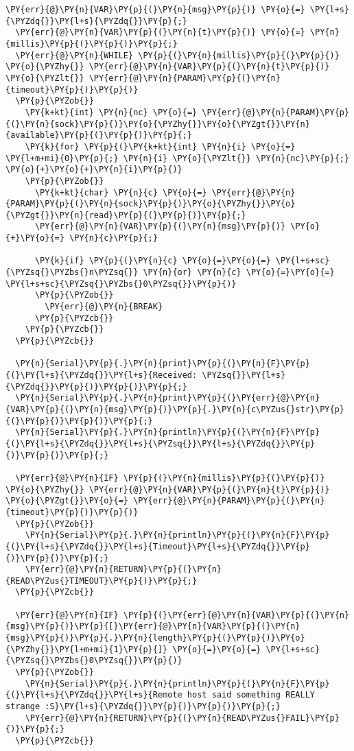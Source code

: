\begin{Verbatim}[commandchars=\\\{\}]
  \PY{err}{@}\PY{n}{VAR}\PY{p}{(}\PY{n}{msg}\PY{p}{)} \PY{o}{=} \PY{l+s}{\PYZdq{}}\PY{l+s}{\PYZdq{}}\PY{p}{;}
  \PY{err}{@}\PY{n}{VAR}\PY{p}{(}\PY{n}{t}\PY{p}{)} \PY{o}{=} \PY{n}{millis}\PY{p}{(}\PY{p}{)}\PY{p}{;}
  \PY{err}{@}\PY{n}{WHILE} \PY{p}{(}\PY{n}{millis}\PY{p}{(}\PY{p}{)} \PY{o}{\PYZhy{}} \PY{err}{@}\PY{n}{VAR}\PY{p}{(}\PY{n}{t}\PY{p}{)} \PY{o}{\PYZlt{}} \PY{err}{@}\PY{n}{PARAM}\PY{p}{(}\PY{n}{timeout}\PY{p}{)}\PY{p}{)}
  \PY{p}{\PYZob{}}
    \PY{k+kt}{int} \PY{n}{nc} \PY{o}{=} \PY{err}{@}\PY{n}{PARAM}\PY{p}{(}\PY{n}{sock}\PY{p}{)}\PY{o}{\PYZhy{}}\PY{o}{\PYZgt{}}\PY{n}{available}\PY{p}{(}\PY{p}{)}\PY{p}{;}
    \PY{k}{for} \PY{p}{(}\PY{k+kt}{int} \PY{n}{i} \PY{o}{=} \PY{l+m+mi}{0}\PY{p}{;} \PY{n}{i} \PY{o}{\PYZlt{}} \PY{n}{nc}\PY{p}{;} \PY{o}{+}\PY{o}{+}\PY{n}{i}\PY{p}{)}
    \PY{p}{\PYZob{}}
      \PY{k+kt}{char} \PY{n}{c} \PY{o}{=} \PY{err}{@}\PY{n}{PARAM}\PY{p}{(}\PY{n}{sock}\PY{p}{)}\PY{o}{\PYZhy{}}\PY{o}{\PYZgt{}}\PY{n}{read}\PY{p}{(}\PY{p}{)}\PY{p}{;}
      \PY{err}{@}\PY{n}{VAR}\PY{p}{(}\PY{n}{msg}\PY{p}{)} \PY{o}{+}\PY{o}{=} \PY{n}{c}\PY{p}{;}
      
      \PY{k}{if} \PY{p}{(}\PY{n}{c} \PY{o}{=}\PY{o}{=} \PY{l+s+sc}{\PYZsq{}\PYZbs{}n\PYZsq{}} \PY{n}{or} \PY{n}{c} \PY{o}{=}\PY{o}{=} \PY{l+s+sc}{\PYZsq{}\PYZbs{}0\PYZsq{}}\PY{p}{)}
      \PY{p}{\PYZob{}}
        \PY{err}{@}\PY{n}{BREAK}
      \PY{p}{\PYZcb{}}
    \PY{p}{\PYZcb{}}
  \PY{p}{\PYZcb{}}
  
  \PY{n}{Serial}\PY{p}{.}\PY{n}{print}\PY{p}{(}\PY{n}{F}\PY{p}{(}\PY{l+s}{\PYZdq{}}\PY{l+s}{Received: \PYZsq{}}\PY{l+s}{\PYZdq{}}\PY{p}{)}\PY{p}{)}\PY{p}{;}
  \PY{n}{Serial}\PY{p}{.}\PY{n}{print}\PY{p}{(}\PY{err}{@}\PY{n}{VAR}\PY{p}{(}\PY{n}{msg}\PY{p}{)}\PY{p}{.}\PY{n}{c\PYZus{}str}\PY{p}{(}\PY{p}{)}\PY{p}{)}\PY{p}{;}
  \PY{n}{Serial}\PY{p}{.}\PY{n}{println}\PY{p}{(}\PY{n}{F}\PY{p}{(}\PY{l+s}{\PYZdq{}}\PY{l+s}{\PYZsq{}}\PY{l+s}{\PYZdq{}}\PY{p}{)}\PY{p}{)}\PY{p}{;}
  
  \PY{err}{@}\PY{n}{IF} \PY{p}{(}\PY{n}{millis}\PY{p}{(}\PY{p}{)} \PY{o}{\PYZhy{}} \PY{err}{@}\PY{n}{VAR}\PY{p}{(}\PY{n}{t}\PY{p}{)} \PY{o}{\PYZgt{}}\PY{o}{=} \PY{err}{@}\PY{n}{PARAM}\PY{p}{(}\PY{n}{timeout}\PY{p}{)}\PY{p}{)}
  \PY{p}{\PYZob{}}
    \PY{n}{Serial}\PY{p}{.}\PY{n}{println}\PY{p}{(}\PY{n}{F}\PY{p}{(}\PY{l+s}{\PYZdq{}}\PY{l+s}{Timeout}\PY{l+s}{\PYZdq{}}\PY{p}{)}\PY{p}{)}\PY{p}{;}
    \PY{err}{@}\PY{n}{RETURN}\PY{p}{(}\PY{n}{READ\PYZus{}TIMEOUT}\PY{p}{)}\PY{p}{;}
  \PY{p}{\PYZcb{}}
  
  \PY{err}{@}\PY{n}{IF} \PY{p}{(}\PY{err}{@}\PY{n}{VAR}\PY{p}{(}\PY{n}{msg}\PY{p}{)}\PY{p}{[}\PY{err}{@}\PY{n}{VAR}\PY{p}{(}\PY{n}{msg}\PY{p}{)}\PY{p}{.}\PY{n}{length}\PY{p}{(}\PY{p}{)}\PY{o}{\PYZhy{}}\PY{l+m+mi}{1}\PY{p}{]} \PY{o}{=}\PY{o}{=} \PY{l+s+sc}{\PYZsq{}\PYZbs{}0\PYZsq{}}\PY{p}{)}
  \PY{p}{\PYZob{}}
    \PY{n}{Serial}\PY{p}{.}\PY{n}{println}\PY{p}{(}\PY{n}{F}\PY{p}{(}\PY{l+s}{\PYZdq{}}\PY{l+s}{Remote host said something REALLY strange :S}\PY{l+s}{\PYZdq{}}\PY{p}{)}\PY{p}{)}\PY{p}{;}
    \PY{err}{@}\PY{n}{RETURN}\PY{p}{(}\PY{n}{READ\PYZus{}FAIL}\PY{p}{)}\PY{p}{;}
  \PY{p}{\PYZcb{}}
  

\end{Verbatim}
